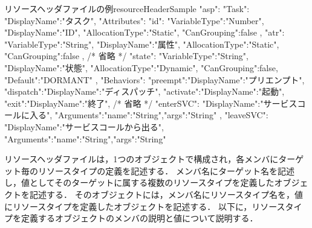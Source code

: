 \begin{File}{リソースヘッダファイルの例}{resourceHeaderSample}
{
  "asp":{
    "Task":{
      "DisplayName":"タスク",
      "Attributes":{
        "id":{
          "VariableType":"Number",
          "DisplayName":"ID",
          "AllocationType":"Static",
          "CanGrouping":false
        },
        "atr":{
          "VariableType":"String",
          "DisplayName":"属性",
          "AllocationType":"Static",
          "CanGrouping":false
        },
        /* 省略 */
        "state":{
          "VariableType":"String",
          "DisplayName":"状態",
          "AllocationType":"Dynamic",
          "CanGrouping":false,
          "Default":"DORMANT"
        }
      },
      "Behaviors":{
        "preempt":{"DisplayName":"プリエンプト"},
        "dispatch":{"DisplayName":"ディスパッチ"},
        "activate":{"DisplayName":"起動"},
        "exit":{"DisplayName":"終了"},
        /* 省略 */
        "enterSVC":{
          "DisplayName":"サービスコールに入る",
          "Arguments":{"name":"String","args":"String"}
        },
        "leaveSVC":{
          "DisplayName":"サービスコールから出る",
          "Arguments":{"name":"String","args":"String"}
        }
      }
    }
  }
}
\end{File}

リソースヘッダファイルは，1つのオブジェクトで構成され，各メンバにターゲット毎のリソースタイプの定義を記述する．
メンバ名にターゲット名を記述し，値としてそのターゲットに属する複数のリソースタイプを定義したオブジェクトを記述する．
そのオブジェクトには，メンバ名にリソースタイプ名を，値にリソースタイプを定義したオブジェクトを記述する．
以下に，リソースタイプを定義するオブジェクトのメンバの説明と値について説明する．


